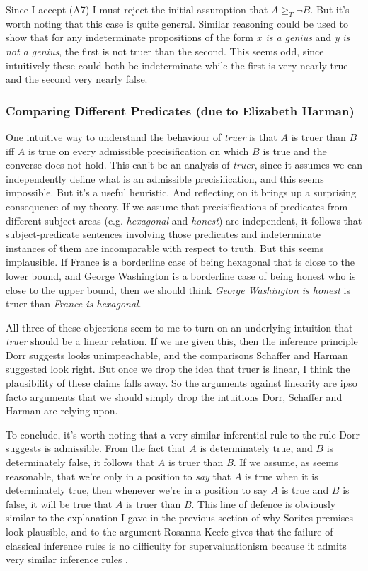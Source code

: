 Since I accept (A7) I must reject the initial assumption that \(A \geqslant _T \neg B\). But it's worth noting that this case is quite general. Similar reasoning could be used to show that for any indeterminate propositions of the form \(x\) \textit{is a genius} and \textit{y} \textit{is not a genius}, the first is not truer than the second. This seems odd, since intuitively these could both be indeterminate while the first is very nearly true and the second very nearly false.

\subsubsection*{Comparing Different Predicates (due to Elizabeth Harman)}

One intuitive way to understand the behaviour of \textit{truer} is that \(A\) is truer than \(B\) iff \(A\) is true on every admissible precisification on which \(B\) is true and the converse does not hold. This can't be an analysis of \textit{truer}, since it assumes we can independently define what is an admissible precisification, and this seems impossible. But it's a useful heuristic. And reflecting on it brings up a surprising consequence of my theory. If we assume that precisifications of predicates from different subject areas (e.g. \textit{hexagonal }and \textit{honest})\textit{ }are independent, it follows that subject-predicate sentences involving those predicates and indeterminate instances of them are incomparable with respect to truth. But this seems implausible. If France is a borderline case of being hexagonal that is close to the lower bound, and George Washington is a borderline case of being honest who is close to the upper bound, then we should think \textit{George Washington is honest} is truer than \textit{France is hexagonal}.

\bigskip

\noindent All three of these objections seem to me to turn on an underlying intuition that \textit{truer} should be a linear relation. If we are given this, then the inference principle Dorr suggests looks unimpeachable, and the comparisons Schaffer and Harman suggested look right. But once we drop the idea that truer is linear, I think the plausibility of these claims falls away. So the arguments against linearity are ipso facto arguments that we should simply drop the intuitions Dorr, Schaffer and Harman are relying upon.

To conclude, it's worth noting that a very similar inferential rule to the rule Dorr suggests is admissible. From the fact that \(A\) is determinately true, and \(B\) is determinately false, it follows that \(A\) is truer than\textit{ B}. If we assume, as seems reasonable, that we're only in a position to \textit{say} that \(A\) is true when it is determinately true, then whenever we're in a position to say \(A\) is true and \(B\) is false, it will be true that \(A\) is truer than \(B\). This line of defence is obviously similar to the explanation I gave in the previous section of why Sorites premises look plausible, and to the argument Rosanna Keefe gives that the failure of classical inference rules is no difficulty for supervaluationism because it admits very similar inference rules \citep{Keefe2000}. 

